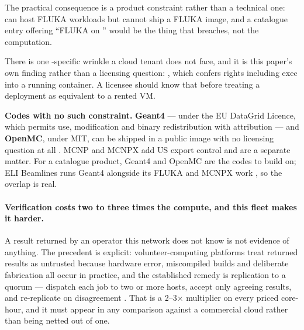 \noindent The practical consequence is a product constraint rather than a technical one: \Flux{} can
host FLUKA workloads but cannot ship a FLUKA image, and a catalogue entry offering ``FLUKA on
\Flux{}'' would be the thing that breaches, not the computation. 

There is one \Flux{}-specific wrinkle a cloud tenant does not face, and it is this paper's own
finding rather than a licensing question: , which confers rights including exec
into a running container. A licensee should know that before treating a \Flux{} deployment as
equivalent to a rented VM.

\textbf{Codes with no such constraint.} \textbf{Geant4} --- under the EU DataGrid Licence, which
permits use, modification and binary redistribution with attribution --- and \textbf{OpenMC}, under
MIT, can be shipped in a public image with no licensing question at all
. MCNP and MCNPX
add US export control and are a separate matter. For a catalogue product, Geant4 and OpenMC are the
codes to build on; ELI Beamlines runs Geant4 alongside its FLUKA and MCNPX work
, so the
overlap is real.

\paragraph{Verification costs two to three times the compute, and this fleet makes it harder.} A
result returned by an operator this network does not know is not evidence of anything. The precedent
is explicit: volunteer-computing platforms treat returned results as untrusted because hardware
error, miscompiled builds and deliberate fabrication all occur in practice, and the established
remedy is replication to a quorum --- dispatch each job to two or more hosts, accept only agreeing
results, and re-replicate on disagreement . That is
a \numrange{2}{3}$\times$ multiplier on every priced core-hour, and it must appear in any comparison
against a commercial cloud rather than being netted out of one.

